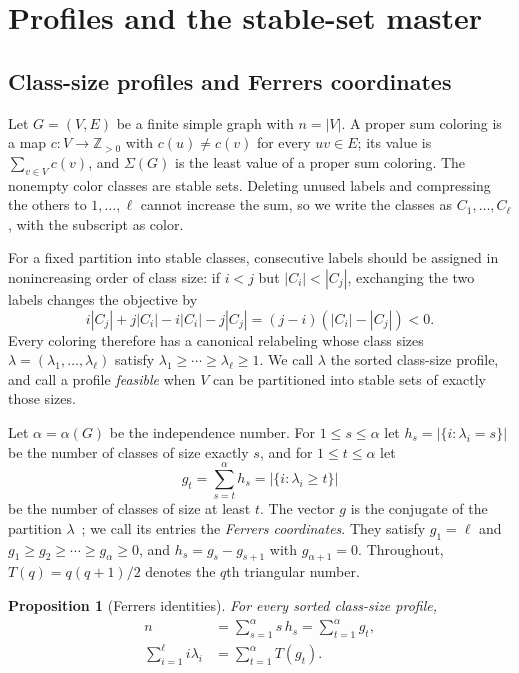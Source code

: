 \documentclass[11pt]{article}
\newtheorem{proposition}[theorem]{Proposition}
\theoremstyle{definition}
\begin{document}
\section{Profiles and the stable-set master}
\label{sec:profiles}

\subsection{Class-size profiles and Ferrers coordinates}

Let $G=(V,E)$ be a finite simple graph with $n=|V|$. A proper sum coloring is a
map $c:V\to\mathbb{Z}_{>0}$ with $c(u)\ne c(v)$ for every $uv\in E$; its value
is $\sum_{v\in V}c(v)$, and $\Sigma(G)$ is the least value of a proper sum
coloring. The nonempty color classes are stable sets. Deleting unused labels
and compressing the others to $1,\ldots,\ell$ cannot increase the sum, so we
write the classes as $C_1,\ldots,C_\ell$, with the subscript as color.

For a fixed partition into stable classes, consecutive labels should be
assigned in nonincreasing order of class size: if $i<j$ but $|C_i|<|C_j|$,
exchanging the two labels changes the objective by
\[
  i|C_j|+j|C_i|-i|C_i|-j|C_j|=(j-i)(|C_i|-|C_j|)<0.
\]
Every coloring therefore has a canonical relabeling whose class sizes
$\lambda=(\lambda_1,\ldots,\lambda_\ell)$ satisfy
$\lambda_1\ge\cdots\ge\lambda_\ell\ge1$. We call $\lambda$ the sorted
class-size profile, and call a profile \emph{feasible} when $V$ can be
partitioned into stable sets of exactly those sizes.

Let $\alpha=\alpha(G)$ be the independence number. For $1\le s\le\alpha$ let
$h_s=|\{i:\lambda_i=s\}|$ be the number of classes of size exactly $s$, and
for $1\le t\le\alpha$ let
\[
  g_t=\sum_{s=t}^{\alpha}h_s=|\{i:\lambda_i\ge t\}|
\]
be the number of classes of size at least $t$. The vector $g$ is the conjugate
of the partition $\lambda$~\cite{andrews1998}; we call its entries the
\emph{Ferrers coordinates}. They satisfy $g_1=\ell$ and
$g_1\ge g_2\ge\cdots\ge g_\alpha\ge0$, and $h_s=g_s-g_{s+1}$ with
$g_{\alpha+1}=0$. Throughout, $T(q)=q(q+1)/2$ denotes the $q$th triangular
number.

\begin{proposition}[Ferrers identities]
\label{prop:ferrers}
For every sorted class-size profile,
\begin{align}
  n &= \sum_{s=1}^{\alpha}s\,h_s=\sum_{t=1}^{\alpha}g_t, \label{eq:mass}\\
  \sum_{i=1}^{\ell} i\lambda_i &= \sum_{t=1}^{\alpha}T(g_t). \label{eq:triangular}
\end{align}
\end{proposition}
\end{document}
